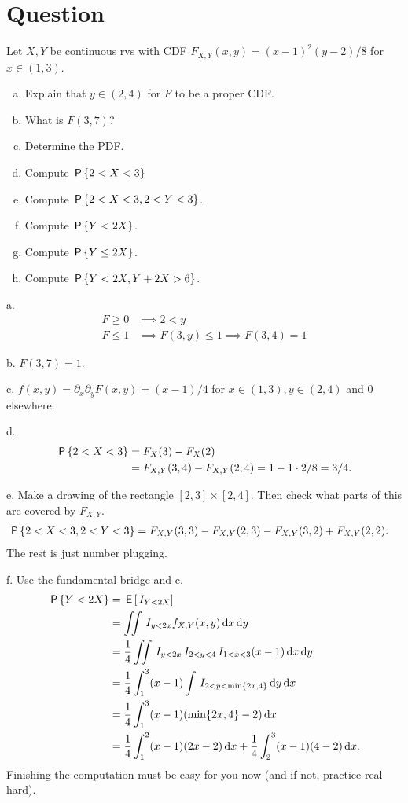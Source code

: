 \section*{Question}

\begin{exercise}
Let $X, Y$ be continuous rvs with CDF $F_{X,Y}(x,y) = (x-1)^{2}(y-2)/8$ for $x \in (1, 3)$.
\begin{enumerate}[a.]
\item Explain that $y\in (2,4)$ for  $F$ to be a proper CDF.
\item What is $F(3,7)$?
\item Determine the PDF.
\item Compute $\P{2< X < 3}$
\item Compute $\P{2< X < 3, 2<Y<3}$.
\item Compute $\P{Y< 2X}$.
\item Compute $\P{Y\leq  2X}$.
\item Compute $\P{Y< 2X, Y+2X > 6}$.
\end{enumerate}
\begin{solution}
a.
\begin{align}
\label{eq:11}
F \geq 0 &\implies 2<y\\
F \leq 1 &\implies F(3, y)\leq 1 \implies F(3,4)=1
\end{align}

b. $F(3,7) = 1$.

c. $f(x,y) = \partial_{x} \partial_{y} F(x,y) = (x-1)/4$ for $x\in(1,3), y\in(2,4)$ and $0$ elsewhere.

d.
\begin{align}
\P{2 < X < 3}
&= F_{X}(3) - F_{X}(2) \\
&= F_{X,Y}(3, 4) - F_{X,Y}(2,4) = 1 - 1\cdot 2/8 = 3/4.
\end{align}

e.
Make a drawing of the rectangle $[2,3]\times[2,4]$. Then check what parts of this are covered by $F_{X,Y}$.
\begin{align}
\P{2 < X < 3, 2 < Y < 3}
&= F_{X,Y}(3, 3) - F_{X,Y}(2,3)  - F_{X,Y}(3, 2) + F_{X,Y}(2,2).
\end{align}
The rest is just number plugging.


f.
Use the fundamental bridge and c.
\begin{align}
\P{Y< 2 X}
&= \E{\1{Y < 2 X}} \\
&= \iint \1{y < 2 x} f_{X,Y}(x,y) \d x \d y\\
&= \frac{1}{4}\iint \1{y < 2 x} \1{2< y <4} \1{1<x<3} (x-1) \d x \d y\\
&= \frac{1}{4}\int_{1}^{3} (x-1) \int \1{2<y < \min\{2 x,4\}}  \d y \d x \\
&= \frac{1}{4}\int_{1}^{3} (x-1) (\min\{2 x,4\}-2) \d x \\
&= \frac{1}{4}\int_{1}^{2} (x-1) (2 x-2) \d x
+ \frac{1}{4}\int_{2}^{3} (x-1) (4-2) \d x.
\end{align}
Finishing the computation must be easy for you now (and if not, practice real hard).


\end{solution}
\end{exercise}
